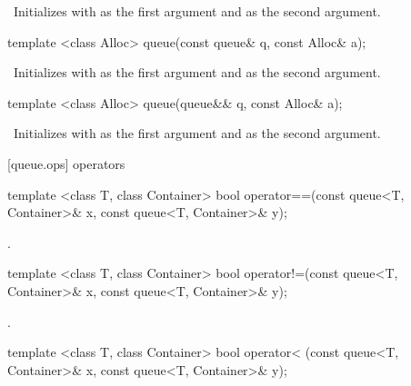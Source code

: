 \begin{itemdescr}
\pnum
\effects\ Initializes  with  as the first argument and 
as the second argument.
\end{itemdescr}

\begin{itemdecl}
template <class Alloc> queue(const queue& q, const Alloc& a);
\end{itemdecl}

\begin{itemdescr}
\pnum
\effects\ Initializes  with  as the first argument and  as the
second argument.
\end{itemdescr}

\begin{itemdecl}
template <class Alloc> queue(queue&& q, const Alloc& a);
\end{itemdecl}

\begin{itemdescr}
\pnum
\effects\ Initializes  with  as the first argument and 
as the second argument.
\end{itemdescr}

[queue.ops]{ operators}

%
\begin{itemdecl}
template <class T, class Container>
  bool operator==(const queue<T, Container>& x, const queue<T, Container>& y);
\end{itemdecl}

\begin{itemdescr}
\pnum
\returns
{}.
\end{itemdescr}

%
\begin{itemdecl}
template <class T, class Container>
  bool operator!=(const queue<T, Container>& x,  const queue<T, Container>& y);
\end{itemdecl}

\begin{itemdescr}
\pnum
\returns
{}.
\end{itemdescr}

%
\begin{itemdecl}
template <class T, class Container>
  bool operator< (const queue<T, Container>& x, const queue<T, Container>& y);
\end{itemdecl}


